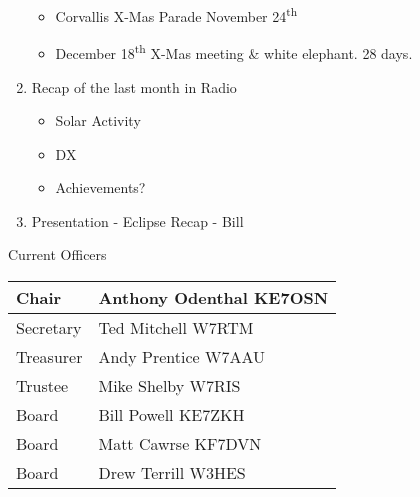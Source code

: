 \documentclass[letter,11pt]{extarticle}
\begin{document}
\begin{enumerate}
\begin{itemize}
				\item Corvallis X-Mas Parade November 24\textsuperscript{th} 
				\item December 18\textsuperscript{th} X-Mas meeting \& white elephant. 28 days.
			\end{itemize}
		\item Recap of the last month in Radio
			\begin{itemize}
				\item Solar Activity
				\item DX
				\item Achievements?
			\end{itemize}
		\item  Presentation - Eclipse Recap - Bill
	\end{enumerate}


	Current Officers \\
	\begin{tabular}{|l|l|} \hline
		Chair & Anthony Odenthal KE7OSN \\ \hline
		Secretary & Ted Mitchell W7RTM \\ \hline
		Treasurer & Andy Prentice W7AAU \\ \hline
		Trustee & Mike Shelby W7RIS   \\ \hline
		Board & Bill Powell KE7ZKH \\ \hline
		Board & Matt Cawrse KF7DVN \\ \hline
		Board & Drew Terrill W3HES\\ \hline
	\end{tabular}
	
	\subsection*{}
	
\end{document}
